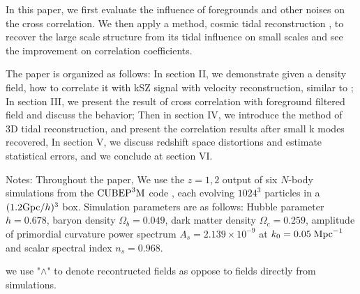In this paper, 
we first evaluate the influence of foregrounds and other noises 
on the cross correlation. 
We then apply a method, cosmic tidal reconstruction \cite{2012:pen,2015:zhu}, 
to recover the large scale structure from its tidal influence on small scales 
and see the improvement on correlation coefficients. 

The paper is organized as follows: 
In section II, we demonstrate given a density field, how to correlate it with kSZ signal with velocity reconstruction, similar to \cite{Shao11}; 
In section III, we present the result of cross correlation with foreground filtered field 
and discuss the behavior; 
Then in section IV, we introduce the method of 3D tidal reconstruction, 
and present the correlation results after small k modes recovered, 
In section V, we discuss redshift space distortions and estimate statistical errors, 
and we conclude at section VI.


Notes: 
Throughout the paper, We use the $z=1,2$ output of six $N$-body simulations from the
$\mathrm{CUBEP}^3\mathrm{M}$ code \cite{2013:code}, each evolving $1024^3$ particles in a $(1.2\mathrm{Gpc}/h)^3$ box. 
Simulation parameters are as follows: Hubble parameter $h=0.678$, baryon
density $\Omega_{b}=0.049$, dark matter density $\Omega_{c}=0.259$,
amplitude of primordial curvature power spectrum $A_s=2.139\times10^{-9}$ at 
$k_0=0.05\;\mathrm{Mpc}^{-1}$ and scalar spectral index $n_s=0.968$.

we use "$\wedge$" to denote recontructed fields as 
oppose to fields directly from simulations.
